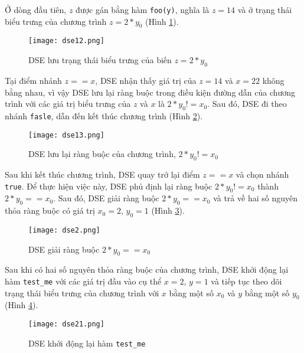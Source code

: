 Ở dòng đầu tiên, $ z $ được gán bằng hàm \texttt{foo(y)}, nghĩa là $ z = 14 $ và ở trạng thái biểu trưng của chương trình $ z = 2*y_{0} $ (Hình \ref{fig:dse12}).

\begin{figure}[H]	
	\begin{center}
		\texttt{[image: dse12.png]}
	\end{center}
	\caption{DSE lưu trạng thái biểu trưng của biến $ z = 2*y_{0} $}
	\label{fig:dse12}	
\end{figure}

Tại điểm nhánh $ z == x $, DSE nhận thấy giá trị của $ z = 14$ và $ x = 22 $ không bằng nhau, vì vậy DSE lưu lại ràng buộc trong điều kiện đường dẫn của chương trình với các giá trị biểu trưng của $ z $ và $ x $ là $ 2*y_{0} != x_{0} $. Sau đó, DSE đi theo nhánh \texttt{fasle}, dẫn đến kết thúc chương trình (Hình \ref{fig:dse13}).

\begin{figure}[H]	
	\begin{center}
		\texttt{[image: dse13.png]}
	\end{center}
	\caption{DSE lưu lại ràng buộc của chương trình, $ 2*y_{0} != x_{0} $  }
	\label{fig:dse13}	
\end{figure}

Sau khi kết thúc chương trình, DSE quay trở lại điểm $ z == x $ và chọn nhánh \texttt{true}. Để thực hiện việc này, DSE phủ định lại ràng buộc $2*y_{0} != x_{0}$ thành $2*y_{0} == x_{0}$. Sau đó, DSE giải ràng buộc $2*y_{0} == x_{0}$ và trả về hai số nguyên thỏa ràng buộc có giá trị $ x_{0} = 2$, $ y_{0} = 1 $ (Hình \ref{fig:dse2}).

\begin{figure}[H]	
	\begin{center}
		\texttt{[image: dse2.png]}
	\end{center}
	\caption{DSE giải ràng buộc $2*y_{0} == x_{0}$}
	\label{fig:dse2}	
\end{figure}

Sau khi có hai số nguyên thỏa ràng buộc của chương trình, DSE khởi động lại hàm \texttt{test\_me} với các giá trị đầu vào cụ thể $ x = 2 $, $ y = 1 $ và tiếp tục theo dõi trạng thái biểu trưng của chương trình với $ x $ bằng một số $x_{0}$ và $ y $ bằng một số $y_{0}$ (Hình \ref{fig:dse21}).

\begin{figure}[H]	
	\begin{center}
		\texttt{[image: dse21.png]}
	\end{center}
	\caption{DSE khởi động lại hàm \texttt{test\_me}}
	\label{fig:dse21}		
\end{figure}

